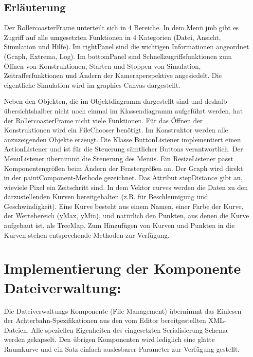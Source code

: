 \subsection{Erläuterung}

Der RollercoasterFrame unterteilt sich in 4 Bereiche. In dem Menü jmb gibt es Zugriff auf alle umgesetzten Funktionen in 4 Kategorien (Datei, Ansicht, Simulation und Hilfe). Im rightPanel sind die wichtigen Informationen angeordnet (Graph, Extrema, Log). Im bottomPanel sind Schnellzugriffsfunktionen zum Öffnen von Konstruktionen, Starten und Stoppen von Simulation, Zeitrafferfunktionen und Ändern der Kameraperspektive angesiedelt. Die eigentliche Simulation wird im graphics-Canvas dargestellt.

Neben den Objekten, die im Objektdiagramm dargestellt sind und deshalb übersichtshalber nicht noch einmal im Klassendiagramm aufgeführt werden, hat der RollercoasterFrame nicht viele Funktionen. Für das Öffnen der Konstruktionen wird ein FileChooser benötigt. Im Konstruktor werden alle anzuzeigenden Objekte erzeugt. Die Klasse ButtonListener implementiert einen ActionListener und ist für die Steuerung sämtlicher Buttons verantwortlich. Der MenuListener übernimmt die Steuerung des Menüs. Ein ResizeListener passt Komponentengrößen beim Ändern der Fenstergrößen an.
Der Graph wird direkt in der paintComponent-Methode gezeichnet. Das Attribut stepDistance gibt an, wieviele Pixel ein Zeitschritt sind. In dem Vektor curves werden die Daten zu den darzustellenden Kurven bereitgehalten (z.B. für Beschleunigung und Geschwindigkeit). Eine Kurve besteht aus einem Namen, einer Farbe der Kurve, der Wertebereich (yMax, yMin), und natürlich den Punkten, aus denen die Kurve aufgebaut ist, als TreeMap. Zum Hinzufügen von Kurven und Punkten in die Kurven stehen entsprechende Methoden zur Verfügung.

\section{Implementierung der Komponente Dateiverwaltung:}

Die Dateiverwaltungs-Komponente (File Management) übernimmt das Einlesen der
Achterbahn-Spezifikationen aus den vom Editor bereitgestellten XML-Dateien. 
Alle speziellen Eigenheiten des eingesetzten Serialisierung-Schema werden gekapselt.
Den übrigen Komponenten wird lediglich eine glatte Raumkurve und ein Satz einfach 
auslesbarer Parameter zur Verfügung gestellt.

